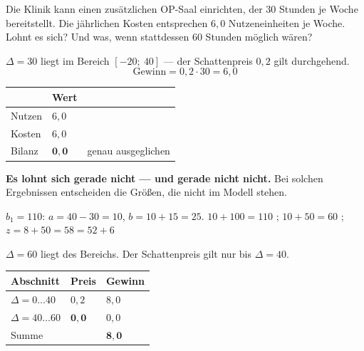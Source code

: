 \begin{aufgabe}
Die Klinik kann einen zusätzlichen OP-Saal einrichten, der $30$ Stunden je Woche bereitstellt. Die jährlichen Kosten entsprechen $6{,}0$ Nutzeneinheiten je Woche. Lohnt es sich? Und was, wenn stattdessen $60$ Stunden möglich wären?

\loesung
{}
$\Delta = 30$ liegt im Bereich $[-20;\ 40]$ --- der Schattenpreis $0{,}2$ gilt durchgehend.
\[ \text{Gewinn} = 0{,}2 \cdot 30 = 6{,}0 \]

\begin{center}
\renewcommand{\arraystretch}{1.48}
\begin{tabular}{@{}P{2.4cm}P{2.2cm}P{2.6cm}@{}}
\toprule
& \textbf{Wert} & \\
\midrule
Nutzen & $6{,}0$ & \\
Kosten & $6{,}0$ & \\
\midrule
Bilanz & $\mathbf{0{,}0}$ & \textcolor{mittel}{genau ausgeglichen}\\
\bottomrule
\end{tabular}
\end{center}

\begin{center}
\begin{minipage}{0.9\textwidth}
\textbf{Es lohnt sich gerade nicht --- und gerade nicht nicht.} Bei solchen Ergebnissen entscheiden die Größen, die nicht im Modell stehen.
\end{minipage}
\end{center}

$b_1 = 110$: $a = 40-30 = 10$, $b = 10+15 = 25$.
 $10 + 100 = 110$ \checkmark; $10+50 = 60$ \checkmark; $z = 8+50 = 58 = 52+6$ \checkmark

$\Delta = 60$ liegt  des Bereichs. Der Schattenpreis gilt nur bis $\Delta = 40$.

\begin{center}
\renewcommand{\arraystretch}{1.48}
\begin{tabular}{@{}P{2.8cm}P{2.2cm}P{2.6cm}@{}}
\toprule
\textbf{Abschnitt} & \textbf{Preis} & \textbf{Gewinn}\\
\midrule
$\Delta = 0 \ldots 40$ & $0{,}2$ & $8{,}0$\\
$\Delta = 40 \ldots 60$ & $\mathbf{0{,}0}$ & $0{,}0$\\
\midrule
Summe & & $\mathbf{8{,}0}$\\
\bottomrule
\end{tabular}
\end{center}


\end{aufgabe}
